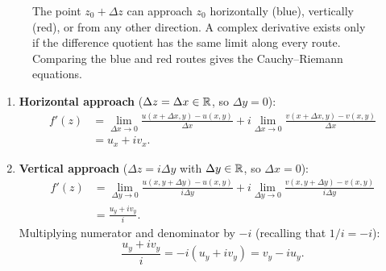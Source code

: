 \begin{figure}[htbp]
\centering
{}
\caption{The point $z_0+\Delta z$ can approach $z_0$ horizontally (blue), vertically
(red), or from any other direction. A complex derivative exists only if the
difference quotient has the same limit along every route. Comparing the blue and red
routes gives the Cauchy--Riemann equations.}
\label{ch35:fig-cr-approach}
\end{figure}
\begin{enumerate}
\item \textbf{Horizontal approach} ($\Delta z = \Delta x \in \mathbb{R}$, so $\Delta y = 0$):
\begin{align*}
f'(z) &= \lim_{\Delta x \to 0} \frac{u(x+\Delta x, y) - u(x,y)}{\Delta x} + i \lim_{\Delta x \to 0} \frac{v(x+\Delta x, y) - v(x,y)}{\Delta x}\\
&= u_x + i v_x.
\end{align*}
\item \textbf{Vertical approach} ($\Delta z = i\Delta y$ with $\Delta y \in \mathbb{R}$, so $\Delta x = 0$):
\begin{align*}
f'(z) &= \lim_{\Delta y \to 0} \frac{u(x, y+\Delta y) - u(x,y)}{i\Delta y} + i \lim_{\Delta y \to 0} \frac{v(x, y+\Delta y) - v(x,y)}{i\Delta y}\\
&= \frac{u_y + i v_y}{i}.
\end{align*}
Multiplying numerator and denominator by $-i$ (recalling that $1/i = -i$):
\[
\frac{u_y + i v_y}{i} = -i(u_y + i v_y) = v_y - i u_y.
\]
\end{enumerate}

